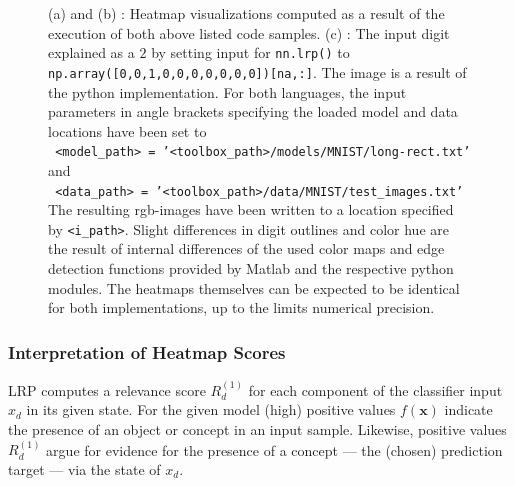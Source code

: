 \documentclass[a4wide]{article}
\newcommand{\x}{\boldsymbol{x}}
\begin{document}
\begin{figure}[h]
\centering
{}
\hspace{0.11\textwidth}
\hspace{0.11\textwidth}
\caption{(a) and (b) : Heatmap visualizations computed as a result of the execution of both above listed code samples. (c) : The input digit explained as a $2$ by setting input for \texttt{nn.lrp()} to \texttt{np.array([0,0,1,0,0,0,0,0,0,0])[na,:]}. The image is a result of the python implementation.  For both languages, the input parameters in angle brackets specifying the loaded model and data locations have been set to\\
\texttt{ <model\_path> = '<toolbox\_path>/models/MNIST/long-rect.txt'} and\\
\texttt{ <data\_path> =  '<toolbox\_path>/data/MNIST/test\_images.txt'}\\
The resulting rgb-images have been written to a location specified by \texttt{<i\_path>}.
Slight differences in digit outlines and color hue are the result of internal differences of the used color maps and edge detection functions provided by Matlab and the respective python modules. The heatmaps themselves can be expected to be identical for both implementations, up to the limits numerical precision.}
\label{fig:example}
\end{figure}

\subsubsection*{Interpretation of Heatmap Scores}
LRP computes a relevance score $R_d^{(1)}$ for each component of the classifier input $x_d$ in its given state. For the given model (high) positive values $f(\x)$ indicate the presence of an object or concept in an input sample.
Likewise, positive values $R_d^{(1)}$ argue for evidence for the presence of a concept --- the (chosen) prediction target --- via the state of $x_d$. 
\end{document}
